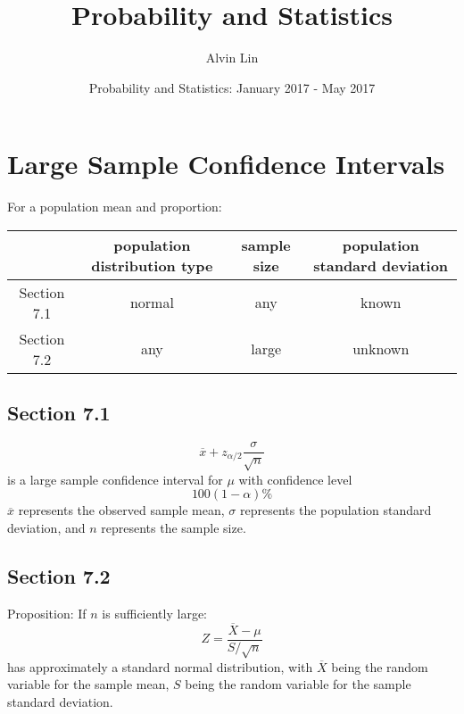 \documentclass[letterpaper, 12pt]{math}
\title{Probability and Statistics}
\author{Alvin Lin}
\date{Probability and Statistics: January 2017 - May 2017}
\begin{document}
\maketitle

\section*{Large Sample Confidence Intervals}
For a population mean and proportion:
\begin{center}
  \begin{tabular}{|c|c|c|c|}
    \hline
    & population distribution type & sample size &
      population standard deviation \\
    \hline
    Section 7.1 & normal & any & known \\
    \hline
    Section 7.2 & any & large & unknown \\
    \hline
  \end{tabular}
\end{center}

\subsection*{Section 7.1}
\[ \overline{x}+z_{\alpha/2}\frac{\sigma}{\sqrt{n}} \]
is a large sample confidence interval for \( \mu \) with confidence level
\[ 100(1-\alpha)\% \]
\( \overline{x} \) represents the observed sample mean, \( \sigma \) represents
the population standard deviation, and \( n \) represents the sample size.

\subsection*{Section 7.2}
Proposition: If \( n \) is sufficiently large:
\[ Z = \frac{\overline{X}-\mu}{S/\sqrt{n}} \]
has approximately a standard normal distribution, with \( \overline{X} \) being
the random variable for the sample mean, \( S \) being the random variable for
the sample standard deviation.
\end{document}

